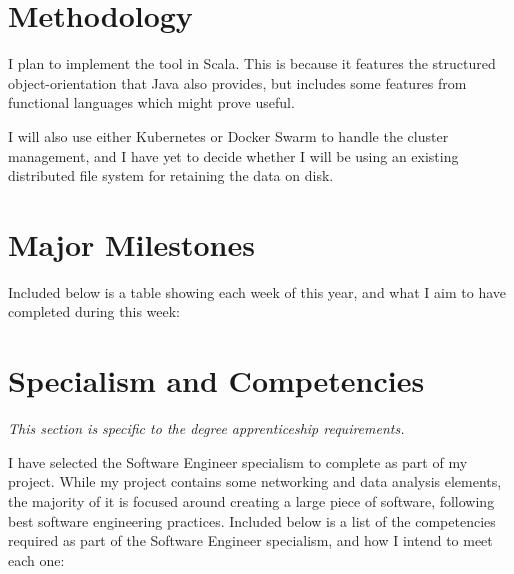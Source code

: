\documentclass[12pt]{article}
\begin{document}
	\section{Methodology}
	I plan to implement the tool in Scala. This is because it features the structured object-orientation that Java also provides, but includes some features from functional languages which might prove useful. 
	
	I will also use either Kubernetes or Docker Swarm to handle the cluster management, and I have yet to decide whether I will be using an existing distributed file system for retaining the data on disk.
	
	\section{Major Milestones}
	Included below is a table showing each week of this year, and what I aim to have completed during this week:
	
	\section{Specialism and Competencies}
	\small{\textit{This section is specific to the degree apprenticeship requirements.}} \medskip
	
	I have selected the Software Engineer specialism to complete as part of my project. While my project contains some networking and data analysis elements, the majority of it is focused around creating a large piece of software, following best software engineering practices.
	Included below is a list of the competencies required as part of the Software Engineer specialism, and how I intend to meet each one:
	
\end{document}
